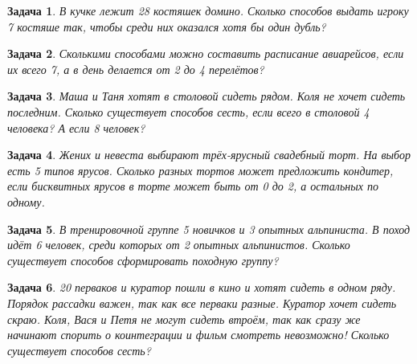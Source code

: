 \documentclass[12pt, a4paper]{article}
\newtheorem{problem}{Задача}
\begin{document}
\begin{problem}
В кучке лежит 28 костяшек домино. Сколько способов выдать игроку 7 костяше так, чтобы среди них оказался хотя бы один дубль?
\begin{sol}

\end{sol}
\end{problem}



\begin{problem}
Сколькими способами можно составить расписание авиарейсов, если их всего 7, а в день делается от 2 до 4 перелётов?
\begin{sol}

\end{sol}
\end{problem}



\begin{problem}
Маша и Таня хотят в столовой сидеть рядом. Коля не хочет сидеть последним. Сколько существует способов сесть, если всего в столовой 4 человека? А если 8 человек? 
\begin{sol}

\end{sol}
\end{problem}



\begin{problem}
Жених и невеста выбирают трёх-ярусный свадебный торт. На выбор есть 5 типов ярусов. Сколько разных тортов может предложить кондитер, если бисквитных ярусов в торте может быть от 0 до 2, а остальных по одному. 
\begin{sol}

\end{sol}
\end{problem}



\begin{problem}
В тренировочной группе 5 новичков и 3 опытных альпиниста. В поход идёт 6 человек, среди которых от 2 опытных альпинистов. Сколько существует способов сформировать походную группу?
\begin{sol}

\end{sol}
\end{problem}



\begin{problem}
20 перваков и куратор пошли в кино и хотят сидеть в одном ряду. Порядок рассадки важен, так как все перваки разные. Куратор хочет сидеть скраю. Коля, Вася и Петя не могут сидеть втроём, так как сразу же начинают спорить о коинтеграции и фильм смотреть невозможно! Сколько существует способов сесть?
\begin{sol}

\end{sol}
\end{problem}
\end{document}
